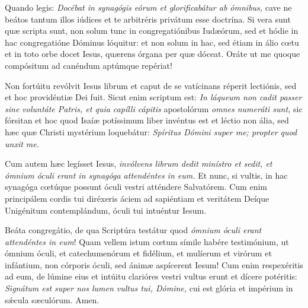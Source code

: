 {\noindent Quando legis: \emph{Docébat in synagógis eórum et glorificabátur ab ómnibus,} cave ne beátos tantum illos iúdices et te arbitréris privátum esse doctrína. Si vera sunt quæ scripta sunt, non solum tunc in congregatiónibus Iudæórum, sed et hódie in hac congregatióne Dóminus lóquitur: et non solum in hac, sed étiam in álio cœtu et in toto orbe docet Iesus, quærens órgana per quæ dóceat. Oráte ut me quoque compósitum ad canéndum aptúmque repériat!

\noindent Non fortúitu revólvit Iesus librum et caput de se vatícinans réperit lectiónis, sed et hoc providéntiæ Dei fuit. Sicut enim scriptum est: \emph{In láqueum non cadit passer sine voluntáte Patris, et quia capílli cápitis} apostolórum \emph{omnes numeráti sunt,} sic fórsitan et hoc quod Isaíæ potíssimum liber invéntus est et léctio non ália, sed hæc quæ Christi mystérium loquebátur: \emph{Spíritus Dómini super me; propter quod unxit me.}

\noindent Cum autem hæc legísset Iesus, \emph{invólvens librum dedit minístro et sedit, et ómnium óculi erant in synagóga attendéntes in eum.} Et nunc, si vultis, in hac synagóga cœtúque possunt óculi vestri atténdere Salvatórem. Cum enim principálem cordis tui diréxeris áciem ad sapiéntiam et veritátem Deíque Unigénitum contemplándum, óculi tui intuéntur Iesum.

\noindent Beáta congregátio, de qua Scriptúra testátur quod \emph{ómnium óculi erant attendéntes in eum}! Quam vellem istum cœtum símile habére testimónium, ut ómnium óculi, et catechumenórum et fidélium, et mulíerum et virórum et infántium, non córporis óculi, sed ánimæ aspícerent Iesum! Cum enim respexéritis ad eum, de lúmine eius et intúitu clarióres vestri vultus erunt et dícere potéritis: \emph{Signátum est super nos lumen vultus tui, Dómine,} cui est glória et impérium in sǽcula sæculórum. Amen.

\vfill
\pagebreak

 

\vspace{-5mm}


\vfill
\pagebreak
}
\newcommand{\benedictus}{\pars{Canticum Zachariæ.} \scriptura{Lc. 4, 14}

\vspace{-4mm}

\antiphona{I D\textsuperscript{2}}{temporalia/ant-regressusiesus.gtex}

\vspace{-2mm}

\scriptura{Lc. 1, 68-79}

\vspace{-2mm}

\cantusSineNeumas
\initiumpsalmi{temporalia/benedictus-initium-isoll-D2-auto.gtex}


 \Abardot{}}
